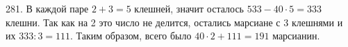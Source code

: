 281. В каждой паре $2+3=5$ клешней, значит осталось $533-40\cdot5=333$ клешни. Так как на 2 это число не делится, остались марсиане с 3 клешнями и их $333:3=111.$ Таким образом, всего было $40\cdot2+111=191$ марсианин.\\
